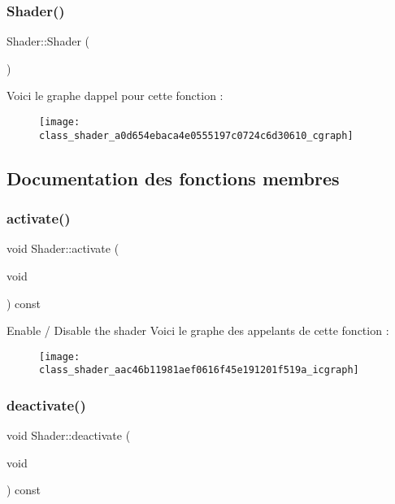 \subsubsection{\texorpdfstring{Shader()}{Shader()}}
{\footnotesize\ttfamily Shader\+::\+Shader (\begin{DoxyParamCaption}{ }\end{DoxyParamCaption})\hspace{0.3cm}{\ttfamily [inline]}}

Voici le graphe d\textquotesingle{}appel pour cette fonction \+:\nopagebreak
\begin{figure}[H]
\begin{center}
\leavevmode
\texttt{[image: class\_shader\_a0d654ebaca4e0555197c0724c6d30610\_cgraph]}
\end{center}
\end{figure}


\subsection{Documentation des fonctions membres}
\mbox{\label{class_shader_aac46b11981aef0616f45e191201f519a}} 
\subsubsection{\texorpdfstring{activate()}{activate()}}
{\footnotesize\ttfamily void Shader\+::activate (\begin{DoxyParamCaption}\item[{void}]{ }\end{DoxyParamCaption}) const}

Enable / Disable the shader Voici le graphe des appelants de cette fonction \+:\nopagebreak
\begin{figure}[H]
\begin{center}
\leavevmode
\texttt{[image: class\_shader\_aac46b11981aef0616f45e191201f519a\_icgraph]}
\end{center}
\end{figure}
\mbox{\label{class_shader_ae7a6e4cdb7719dc501a61d6ef732ad98}} 
\subsubsection{\texorpdfstring{deactivate()}{deactivate()}}
{\footnotesize\ttfamily void Shader\+::deactivate (\begin{DoxyParamCaption}\item[{void}]{ }\end{DoxyParamCaption}) const}

